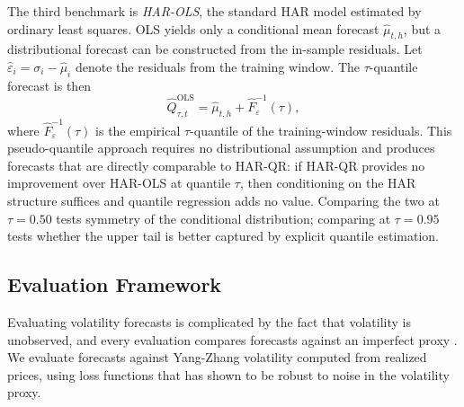 The third benchmark is \emph{HAR-OLS}, the standard HAR model estimated
by ordinary least squares. OLS yields only a conditional mean forecast
$\hat{\mu}_{t,h}$, but a distributional forecast can be constructed from
the in-sample residuals. Let $\hat{\varepsilon}_i = \sigma_i - \hat{\mu}_i$
denote the residuals from the training window. The $\tau$-quantile forecast
is then
\begin{equation}
\label{eq:har-ols-quantile}
\hat{Q}_{\tau,t}^{\text{OLS}} = \hat{\mu}_{t,h} + \hat{F}^{-1}_{\varepsilon}(\tau),
\end{equation}
where $\hat{F}^{-1}_{\varepsilon}(\tau)$ is the empirical $\tau$-quantile of
the training-window residuals. This pseudo-quantile approach requires no
distributional assumption and produces forecasts that are directly comparable
to HAR-QR: if HAR-QR provides no improvement over HAR-OLS at quantile $\tau$,
then conditioning on the HAR structure suffices and quantile regression adds
no value. Comparing the two at $\tau = 0.50$ tests symmetry of the conditional
distribution; comparing at $\tau = 0.95$ tests whether the upper tail is
better captured by explicit quantile estimation.

\subsection{Evaluation Framework}
\label{sec:meth-evaluation}

Evaluating volatility forecasts is complicated by the fact that volatility
is unobserved, and every evaluation compares forecasts against an imperfect
proxy \parencite{pattonVolatilityForecastComparison}. We evaluate forecasts
against Yang-Zhang volatility computed from realized prices, using loss
functions that \textcite{pattonVolatilityForecastComparison} has shown to
be robust to noise in the volatility proxy.


